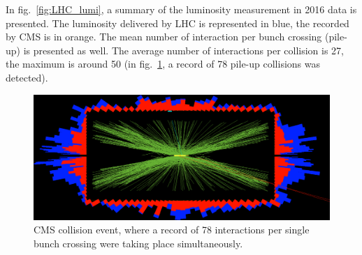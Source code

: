 \noindent In fig.~\ref{fig:LHC_lumi}, a summary of the luminosity measurement in 2016 data is presented. The luminosity delivered by LHC is represented in blue, the recorded by CMS is in orange. The mean number of interaction per bunch crossing (pile-up) is presented as well. The average number of interactions per collision is 27, the maximum is around 50 (in fig.~\ref{fig:pp_pileup}, a record of 78 pile-up collisions was detected).

\begin{figure}[!htb]
  \centering
    \includegraphics[width=.5\textwidth]{figures/78events_PU_b.png}
  \caption{CMS collision event, where a record of 78 interactions per single bunch crossing were taking place simultaneously.}
  \label{fig:pp_pileup}
\end{figure}


